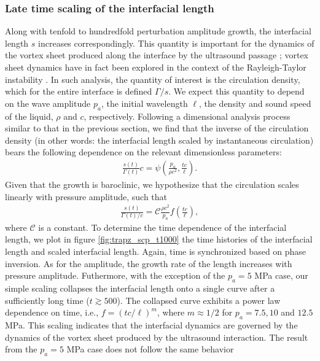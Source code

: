 \subsubsection{Late time scaling of the interfacial length}

Along with tenfold to hundredfold perturbation amplitude growth, the
interfacial length $s$ increases correspondingly. This quantity is
important for the dynamics of the vortex sheet produced along the
interface by the ultrasound passage \cite{Pozrikidis2000}; vortex
sheet dynamics have in fact been explored in the context of the
Rayleigh-Taylor instability \cite[]{Tryggvason1988}. In such analysis,
the quantity of interest is the circulation density, which for the
entire interface is defined $\Gamma / s$.  We expect this quantity to
depend on the wave amplitude $p_a$, the initial wavelength $\ell$, the
density and sound speed of the liquid, $\rho$ and $c$,
respectively. Following a dimensional analysis process similar to that
in the previous section, we find that the inverse of the circulation
density (in other words: the interfacial length scaled by
instantaneous circulation) bears the following dependence on the
relevant dimensionless parameters:%
%
\begin{align}
  \frac{s(t)}{\Gamma(t)}c = \psi\left(\frac{p_a}{\rho c^2},\frac{tc}{\ell}\right).%
\end{align}
%
Given that the growth is baroclinic, we hypothesize that the
circulation scales linearly with pressure amplitude, such that%
%
\begin{align}
  \frac{s(t)}{\Gamma(t)/c} = \mathcal{C} \frac{\rho c^2}{p_a}f\left(\frac{tc}{\ell}\right),%
\end{align}%
where $\mathcal{C}$ is a constant.  To determine the time dependence
of the interfacial length, we plot in figure \ref{fig:trapz_scp_t1000}
the time histories of the interfacial length and scaled interfacial
length. Again, time is synchronized based on phase inversion. As for
the amplitude, the growth rate of the length increases with pressure
amplitude. Futhermore, with the exception of the $p_a = 5$ MPa case,
our simple scaling collapses the interfacial length onto a single
curve after a sufficiently long time ($t\gtrsim 500$). The collapsed
curve exhibits a power law dependence on time, i.e., $f=(tc/\ell)^m$,
where $m \approx 1/2$ for $p_a = 7.5, 10$ and $12.5$ MPa. This scaling
indicates that the interfacial dynamics are governed by the dynamics
of the vortex sheet produced by the ultrasound interaction.  The
result from the $p_a = 5$ MPa case does not follow the same behavior
